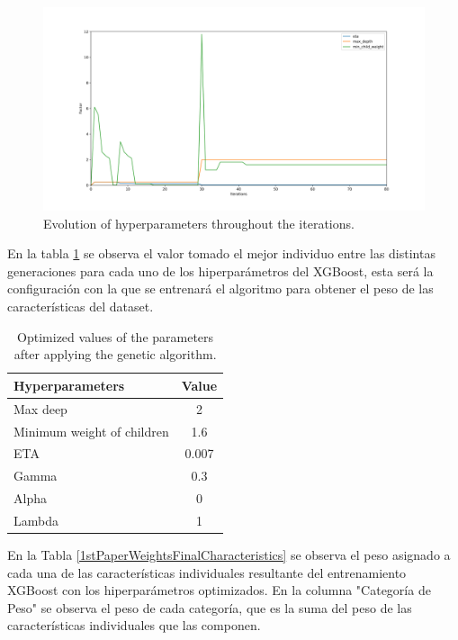 \documentclass{uathesis-es}
\begin{document}
{ \begin{figure}[H]
	     \centering
	     \includegraphics[width=14cm]{Figures/1stPaper/EvolutionH.png}
	     \caption{Evolution of hyperparameters throughout the iterations.}
	     \label{EvolucionHiperparametrosImage}
 \end{figure}


En la tabla \ref{BestGASolutionTable} se observa el valor tomado el mejor individuo entre las distintas generaciones para cada uno de los hiperparámetros del XGBoost, esta será la configuración con la que se entrenará el algoritmo para obtener el peso de las características del dataset.

\begin{table}[h]
	\centering
	\begin{tabular}{ |l|c| } 
		\hline
		\textbf{Hyperparameters} & \textbf{Value}\\
		\hline
		Max deep & 2 \\
		Minimum weight of children & 1.6 \\ 
		ETA & 0.007 \\
		Gamma & 0.3 \\
		Alpha & 0 \\
		Lambda & 1 \\
		\hline
	\end{tabular}
	\caption{Optimized values of the parameters after applying the genetic algorithm.}
	\label{BestGASolutionTable}
\end{table}


En la Tabla \ref{1stPaperWeightsFinalCharacteristics} se observa el peso asignado a cada una de las características individuales resultante del entrenamiento XGBoost con los hiperparámetros optimizados. En la columna "Categoría de Peso" se observa el peso de cada categoría, que es la suma del peso de las características individuales que las componen.

}
\end{document}
